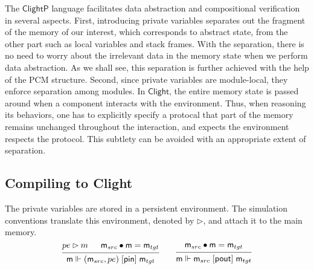 \documentclass[acmsmall,screen,review,anonymous]{acmart}
\newcommand{\kw}[1]{\ensuremath{ \mathsf{#1} }}
\newcommand{\ifr}[1]{\mathrel{[{#1}]}}
\newcommand{\ClightP}{\ensuremath{ \mathsf{ClightP} }}
\newcommand{\Clight}{\ensuremath{ \mathsf{Clight} }}
\begin{document}
The \ClightP{} language facilitates data abstraction
and compositional verification
in several aspects.
First,
introducing private variables separates out
the fragment of the memory of our interest,
which corresponds to abstract state,
from the other part such as local variables and stack frames.
With the separation, there is no need to
worry about the irrelevant data in the memory state
when we perform data abstraction.
As we shall see, this separation is further
achieved with the help of the PCM structure.
Second, since private variables are module-local,
they enforce separation among modules.
In $\Clight$, the entire memory state is passed around
when a component interacts with the environment.
Thus, when reasoning its behaviors,
one has to explicitly specify a protocal
that part of the memory remains unchanged
throughout the interaction,
and expects the environment respects the protocol.
This subtlety can be avoided with an appropriate extent of separation.




\subsection{Compiling to Clight} %

The private variables are stored
in a persistent environment.
The simulation conventions translate
this environment, denoted by $\rhd$,
and attach it to the main memory.
\[
  \begin{prooftree}
    \hypo{pe \rhd m}
    \hypo{\kw{m}_{src} \bullet \kw{m} = \kw{m}_{tgt}}
    \infer2{\kw{m} \Vdash (\kw{m}_{src}, pe) \ifr{\kw{pin}} \kw{m}_{tgt}}
  \end{prooftree}
  \qquad
  \begin{prooftree}
    \hypo{\kw{m}_{src} \bullet \kw{m} = \kw{m}_{tgt}}
    \infer1{\kw{m} \Vdash \kw{m}_{src} \ifr{\kw{pout}} \kw{m}_{tgt}}
  \end{prooftree}
\]
\end{document}
